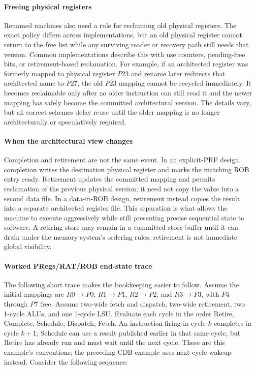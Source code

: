 \paragraph{Freeing physical registers}\label{par:ilp-freeing-pregs}
Renamed machines also need a rule for reclaiming old physical registers.
The exact policy differs across implementations, but an old physical register cannot return to the free list while any surviving reader or recovery path still needs that version.
Common implementations describe this with use counters, pending-free bits, or retirement-based reclamation.
For example, if an architected register was formerly mapped to physical register $P23$ and rename later redirects that architected name to $P27$, the old $P23$ mapping cannot be recycled immediately.
It becomes reclaimable only after no older instruction can still read it and the newer mapping has safely become the committed architectural version.
The details vary, but all correct schemes delay reuse until the older mapping is no longer architecturally or speculatively required.

\paragraph{When the architectural view changes}\label{par:ilp-areg-write-timing}
Completion and retirement are not the same event.
In an explicit-PRF design, completion writes the destination physical register and marks the matching ROB entry ready.
Retirement updates the committed mapping and permits reclamation of the previous physical version; it need not copy the value into a second data file.
In a data-in-ROB design, retirement instead copies the result into a separate architected register file.
This separation is what allows the machine to execute aggressively while still presenting precise sequential state to software.
A retiring store may remain in a committed store buffer until it can drain under the memory system's ordering rules; retirement is not immediate global visibility.

\paragraph{Worked PRegs/RAT/ROB end-state trace}\label{par:ilp-preg-rob-worked}
The following short trace makes the bookkeeping easier to follow.
Assume the initial mappings are $R0\rightarrow P0$, $R1\rightarrow P1$, $R2\rightarrow P2$, and $R3\rightarrow P3$, with $P4$ through $P7$ free.
Assume two-wide fetch and dispatch, two-wide retirement, two 1-cycle ALUs, and one 1-cycle LSU.
Evaluate each cycle in the order Retire, Complete, Schedule, Dispatch, Fetch.
An instruction firing in cycle $k$ completes in cycle $k+1$; Schedule can use a result published earlier in that same cycle, but Retire has already run and must wait until the next cycle.
These are this example's conventions; the preceding CDB example uses next-cycle wakeup instead.
Consider the following sequence:

